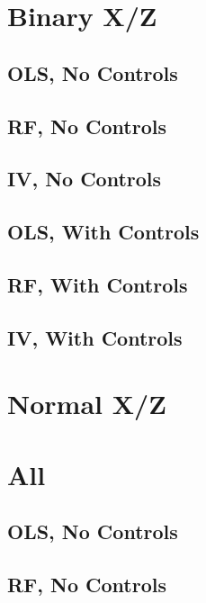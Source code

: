 \documentclass{article}
\begin{document}
\begin{landscape}

\section{Binary X/Z}
\subsection{OLS, No Controls}

\clearpage
\subsection{RF, No Controls}

\clearpage
\subsection{IV, No Controls}

\clearpage

\subsection{OLS, With Controls}

\clearpage
\subsection{RF, With Controls}

\clearpage
\subsection{IV, With Controls}

\clearpage

\section{Normal X/Z}
\section{All}
\subsection{OLS, No Controls}

\clearpage
\subsection{RF, No Controls}

\clearpage

\end{landscape}
\end{document}

